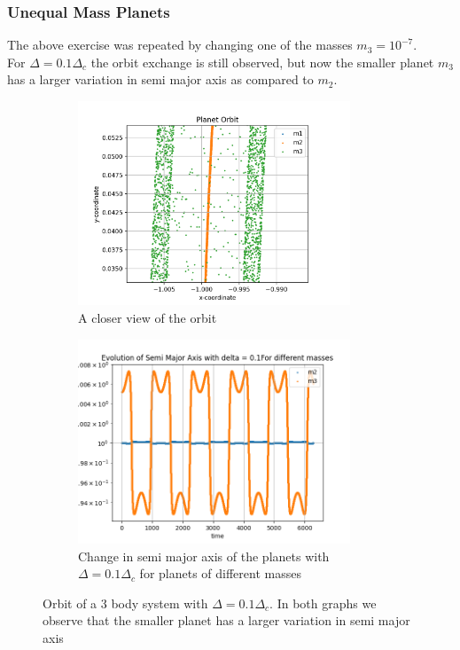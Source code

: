 \documentclass[12pt,a4paper]{article}
\begin{document}
\subsubsection{Unequal Mass Planets}
The above exercise was repeated by changing one of the masses $m_3= 10^{-7}$. \\
For $\Delta=0.1\Delta_c$ the orbit exchange is still observed, but now the smaller planet $m_3$ has a larger variation in semi major axis as compared to $m_2$.
\begin{figure}[H]
  \centering
  \begin{subfigure}{0.49\textwidth}
    \centering
    \includegraphics[height = 2.4in]{3Body/3BD_orbit_delta0.1_Close_2.png}
    \caption{A closer view of the orbit}
    \label{fig:3Body_0.1_close_ueq}
  \end{subfigure}

  \begin{subfigure}{0.49\textwidth}
    \centering
    \includegraphics[height = 2.4in]{3Body/3BD_a_delta_20.1.png}
    \caption{Change in semi major axis of the planets with $\Delta = 0.1\Delta_c$ for planets of different masses}
    \label{fig:3Body_0.1_close_ueq_a}
  \end{subfigure}
  \caption{Orbit of a 3 body system with $\Delta = 0.1\Delta_c$. In both graphs we observe that the smaller planet has a larger variation in semi major axis}
\end{figure}
\end{document}
